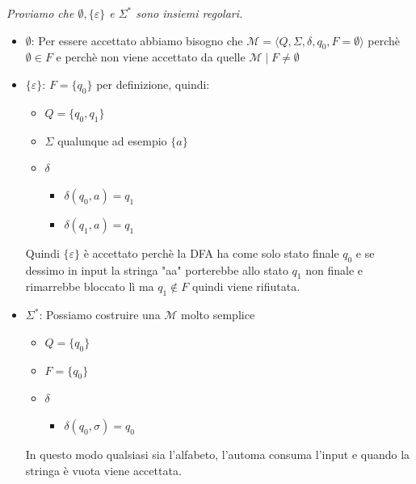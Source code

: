 \documentclass[12pt, a4paper]{report}
\begin{document}
                \begin{exercise}
                    \textit{Proviamo che $\emptyset,\{\varepsilon\}$ e $\Sigma^*$ sono insiemi regolari.}
                    \begin{itemize}
                        \item $\emptyset$: Per essere accettato abbiamo bisogno che $\mathcal{M}=\langle Q,\Sigma, \delta, q_0, F=\emptyset\rangle$ perchè $\emptyset\in F$ e perchè non viene accettato da quelle $\mathcal{M}\mid F\neq\emptyset$
                        \item $\{\varepsilon\}$: $F=\{q_0\}$ per definizione, quindi: \begin{itemize}
                            \item $Q=\{q_0,q_1\}$
                            \item $\Sigma$ qualunque ad esempio $\{a\}$
                            \item $\delta$ \begin{itemize}
                                \item $\delta(q_0,a)=q_1$
                                \item $\delta(q_1,a)=q_1$
                            \end{itemize} 
                        \end{itemize}
                        Quindi $\{\varepsilon\}$ è accettato perchè la DFA ha come solo stato finale $q_0$ e se dessimo in input la stringa "aa" porterebbe allo stato $q_1$ non finale e rimarrebbe bloccato lì ma $q_1\notin F$ quindi viene rifiutata.
                        \item $\Sigma^*$: Possiamo costruire una $\mathcal{M}$ molto semplice \begin{itemize}
                            \item $Q=\{q_0\}$
                            \item $F=\{q_0\}$
                            \item $\delta$\begin{itemize}
                                \item $\delta(q_0,\sigma)=q_0$
                            \end{itemize}
                        \end{itemize}
                        In questo modo qualsiasi sia l'alfabeto, l'automa consuma l'input e quando la stringa è vuota viene accettata.
                    \end{itemize}
                \end{exercise}
\end{document}

